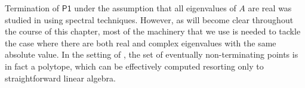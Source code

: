 

Termination of $\mathsf{P1}$ under the assumption that all eigenvalues
of $A$ are real was studied in \cite{RMM,RMM1} using spectral
techniques. However, as will become clear throughout the course of
this chapter, most of the machinery that we use is needed to tackle the
case where there are both real and complex eigenvalues with the same
absolute value. In the setting of \cite{RMM,RMM1}, the set of
eventually non-terminating points is in fact a polytope, which can be
effectively computed resorting only to straightforward linear algebra.

